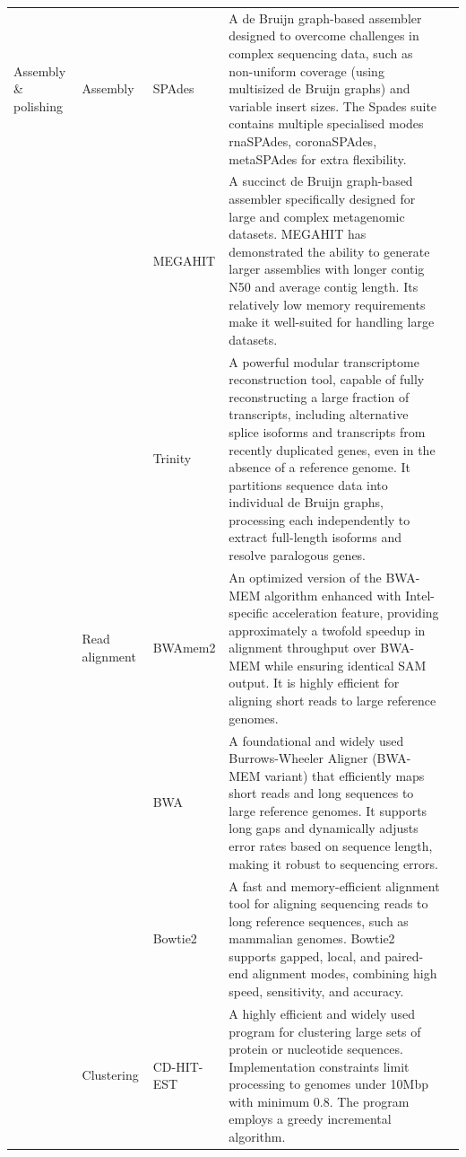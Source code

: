 \begin{longtable}{p{2cm}p{1.8cm}p{1.8cm}p{8.3cm}p{1cm}}
Assembly \& polishing & Assembly & SPAdes & A de Bruijn graph-based assembler designed to overcome challenges in complex sequencing data, such as non-uniform coverage (using multisized de Bruijn graphs) and variable insert sizes. The Spades suite contains multiple specialised modes rnaSPAdes, coronaSPAdes, metaSPAdes for extra flexibility. & \citep{Meleshko2021-gb} \\
\cmidrule{3-5}
 &  & MEGAHIT & A succinct de Bruijn graph-based assembler specifically designed for large and complex metagenomic datasets. MEGAHIT has demonstrated the ability to generate larger assemblies with longer contig N50 and average contig length. Its relatively low memory requirements make it well-suited for handling large datasets. & \citep{Li2016-sd} \\
\cmidrule{3-5}
 &  & Trinity & A powerful modular transcriptome reconstruction tool, capable of fully reconstructing a large fraction of transcripts, including alternative splice isoforms and transcripts from recently duplicated genes, even in the absence of a reference genome. It partitions sequence data into individual de Bruijn graphs, processing each independently to extract full-length isoforms and resolve paralogous genes. & \citep{Grabherr2011-ef} \\
\cmidrule{2-5}
 & Read alignment & BWAmem2 & An optimized version of the BWA-MEM algorithm enhanced with Intel-specific acceleration feature, providing approximately a twofold speedup in alignment throughput over BWA-MEM while ensuring identical SAM output. It is highly efficient for aligning short reads to large reference genomes. & \citep{Vasimuddin2019-rb} \\
\cmidrule{3-5}
 &  & BWA & A foundational and widely used Burrows-Wheeler Aligner (BWA-MEM variant) that efficiently maps short reads and long sequences to large reference genomes. It supports long gaps and dynamically adjusts error rates based on sequence length, making it robust to sequencing errors. & \citep{Li2013-pp} \\
\cmidrule{3-5}
 &  & Bowtie2 & A fast and memory-efficient alignment tool for aligning sequencing reads to long reference sequences, such as mammalian genomes. Bowtie2 supports gapped, local, and paired-end alignment modes, combining high speed, sensitivity, and accuracy. & \citep{Langmead2019-wx} \\
\cmidrule{2-5}
 & Clustering & CD-HIT-EST & A highly efficient and widely used program for clustering large sets of protein or nucleotide sequences. Implementation constraints limit processing to genomes under 10Mbp with minimum 0.8. The program employs a greedy incremental algorithm. & \citep{Li2006-nj} \\

\end{longtable}
